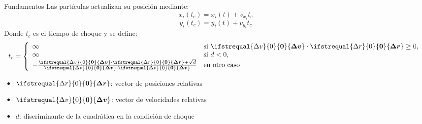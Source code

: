 \documentclass{beamer}
\renewcommand\vec[1]{\ifstrequal{#1}{0}{\ensuremath{\mathbf{0}}}{\ensuremath{\boldsymbol{#1}}}}
\begin{document}
\begin{frame}{Fundamentos}
    Las partículas actualizan su posición mediante:
    \begin{equation*}
        x_i(t_c) = x_i(t) + v_{x_i}t_c
    \end{equation*}
    \begin{equation*}
        y_i(t_c) = y_i(t) + v_{y_i}t_c
    \end{equation*}
    Donde $t_c$ es el tiempo de choque y se define:
    \begin{equation*} 
        t_c=
        \left\{
        \begin{array}{ll}
        \infty & \text{si } \vec{\Delta v}\cdot\vec{\Delta r}\ge0,\\
        \infty & \text{si } d<0,\\
        -\frac{\vec{\Delta v}\cdot\vec{\Delta r}+\sqrt{d}}{\vec{\Delta v}\cdot\vec{\Delta v}}  & \text{en otro caso}
        \end{array}
        \right. 
    \end{equation*}
    \begin{itemize}
        \item $\vec{\Delta r}$: vector de posiciones relativas
        \item $\vec{\Delta v}$: vector de velocidades relativas
        \item $d$: discriminante de la cuadrática en la condición de choque
    \end{itemize}
\end{frame}
\end{document}
